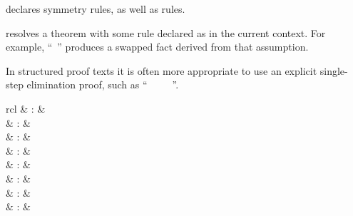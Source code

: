\begin{isabellebody}
\begin{isamarkuptext}
\begin{descr}
  \item [\mbox{\isa{sym}}] declares symmetry rules, as well as
  \mbox{} rules.

  \item [\mbox{\isa{symmetric}}] resolves a theorem with some rule
  declared as \mbox{} in the current context.  For example,
  ``\mbox{}~'' produces a
  swapped fact derived from that assumption.

  In structured proof texts it is often more appropriate to use an
  explicit single-step elimination proof, such as ``\mbox{}~~\mbox{}~\mbox{}~~\mbox{\isa{\isacommand{{\isachardot}{\isachardot}}}}''.

  \end{descr}%
\end{isamarkuptext}%
\isamarkuptrue%
%
\isamarkuptrue%
%
\isamarkuptrue%
%
\begin{isamarkuptext}%
\begin{matharray}{rcl}
    \mbox{} & : & \isarmeth \\
    \mbox{} & : & \isarmeth \\
    \mbox{} & : & \isarmeth \\[0.5ex]
    \mbox{}\isa{{\isachardoublequote}\isactrlsup {\isacharasterisk}{\isachardoublequote}} & : & \isarmeth \\
    \mbox{}\isa{{\isachardoublequote}\isactrlsup {\isacharasterisk}{\isachardoublequote}} & : & \isarmeth \\
    \mbox{}\isa{{\isachardoublequote}\isactrlsup {\isacharasterisk}{\isachardoublequote}} & : & \isarmeth \\
    \mbox{} & : & \isarmeth \\
    \mbox{} & : & \isarmeth \\
  \end{matharray}


\end{isamarkuptext}
\end{isabellebody}
